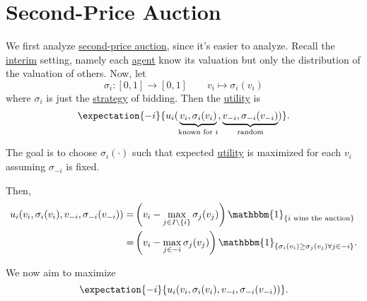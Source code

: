 \section{Second-Price Auction}
We first analyze \hyperref[eg:second-price-auction]{second-price auction}, since it's easier to analyze. Recall the \hyperref[def:interim]{interim} setting,
namely each \hyperref[def:player]{agent} know its valuation but only the distribution of the valuation of others. Now, let
\[
	\sigma_{i}\colon [0, 1]\to [0, 1]\qquad v_{i}\mapsto  \sigma_{i}(v_{i})
\]
where \(\sigma_{i}\) is just the \hyperref[def:strategy]{strategy} of bidding. Then the \hyperref[def:reward]{utility} is
\[
	\expectation{-i}{u_{i}(\underbrace{v_{i}, \sigma_{i}(v_{i})}_{\text{known for \(i\)}}, \underbrace{v_{-i}, \sigma_{-i}(v_{-i})}_{\text{random}})}.
\]

The goal is to choose \(\sigma_{i}(\cdot)\) such that expected \hyperref[def:reward]{utility} is maximized for each \(v_{i}\)
assuming \(\sigma_{-i}\) is fixed.

Then,
\[
	\begin{split}
		u_{i}(v_{i}, \sigma_{i}(v_{i}), v_{-i}, \sigma_{-i}(v_{-i}))
		=&\left(v_{i} - \max_{j\in I\setminus\{i\}}\sigma_{j}(v_{j})\right)\mathbbm{1}_{\{\text{\(i\) wins the auction}\}}\\
		=&\left(v_{i} - \max_{j\in -i}\sigma_{j}(v_{j})\right)\mathbbm{1}_{\{ \sigma_{i}(v_{i})\geq \sigma_{j}(v_{j}) \forall j\in -i \}}.
	\end{split}
\]

We now aim to maximize
\[
	\expectation{-i}{u_{i}(v_{i}, \sigma_{i}(v_{i}), v_{-i}, \sigma_{-i}(v_{-i}))}.
\]

